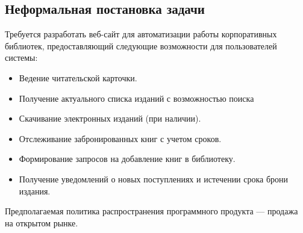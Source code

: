 \documentclass[./intro.tex]{subfiles}
\begin{document}
\subsection{Неформальная постановка задачи}
\par
Требуется разработать веб-сайт для автоматизации работы корпоративных библиотек, предоставляющий следующие возможности для пользователей системы:
\begin{itemize}
    \item Ведение читательской карточки.
    \item Получение актуального списка изданий с возможностью поиска
    \item Скачивание электронных изданий (при наличии).
    \item Отслеживание забронированных книг с учетом сроков.
    \item Формирование запросов на добавление книг в библиотеку.
    \item Получение уведомлений о новых поступлениях и истечении срока брони издания.
\end{itemize}
\par
Предполагаемая политика распространения программного продукта --- продажа на открытом рынке.
\end{document}
